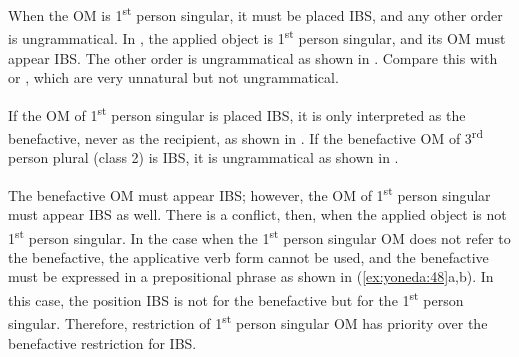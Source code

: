 \documentclass[output=paper,
            colorlinks, citecolor=brown
            ,draftmode
		  ]{langscibook}
\begin{document}
\ea%
    \label{ex:yoneda:46}
    \z
\z

         

    When the OM is 1\textsuperscript{st} person singular, it must be placed IBS, and any other order is ungrammatical. In , the applied object is 1\textsuperscript{st} person singular, and its OM must appear IBS. The other order is ungrammatical as shown in . Compare this with  or , which are very unnatural but not ungrammatical.  

\ea%
    \label{ex:yoneda:47}
    \z
\z

      If the OM of 1\textsuperscript{st} person singular is placed IBS, it is only interpreted as the benefactive, never as the recipient, as shown in .  If the benefactive OM of 3\textsuperscript{rd} person plural (class 2) is IBS, it is ungrammatical as shown in .

    The benefactive OM must appear IBS; however, the OM of 1\textsuperscript{st} person singular must appear IBS as well. There is a conflict, then, when the applied object is not 1\textsuperscript{st} person singular. In the case when the 1\textsuperscript{st} person singular OM does not refer to the benefactive, the applicative verb form cannot be used, and the benefactive must be expressed in a prepositional phrase as shown in (\ref{ex:yoneda:48}a,b). In this case, the position IBS is not for the benefactive but for the 1\textsuperscript{st} person singular. Therefore, restriction of 1\textsuperscript{st} person singular OM has priority over the benefactive restriction for IBS. 
\end{document}
